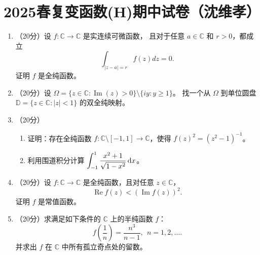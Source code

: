 \section{2025春复变函数(H)期中试卷（沈维孝）}
\begin{enumerate}
\item[一]（20分）设 $f: \mathbb{C} \rightarrow \mathbb{C}$ 是实连续可微函数，
且对于任意 $a \in \mathbb{C}$ 和 $r>0$，都成立
$$\int_{|z-a|=r} f(z) dz=0.$$
证明 $f$ 是全纯函数。
\item[二]（20分）设 $\Omega=\{z \in \mathbb{C}: \operatorname{Im}(z)>0\} \setminus \{i y: y \geq 1\}$。
找一个从 $\Omega$ 到单位圆盘 $\mathbb{D}=\{z \in \mathbb{C}:|z|<1\}$ 的双全纯映射。
\item[三]（20分）
\begin{enumerate}[label=(\arabic*)]
\item 证明：存在全纯函数 $f: \mathbb{C} \setminus [-1,1] \rightarrow \mathbb{C}$，使得 $f(z)^2=(z^2-1)^{-1}$。
\item 利用围道积分计算 $\displaystyle\int_{-1}^1 \frac{x^2+1}{\sqrt{1-x^2}}\,{\rm d}x$。
\end{enumerate}
\item[四]（20分）设 $f: \mathbb{C} \rightarrow \mathbb{C}$ 是全纯函数，且对任意 $z \in \mathbb{C}$，
$$\operatorname{Re} f(z)<(\operatorname{Im} f(z))^2.$$
证明 $f$ 是常值函数。
\item[五]（20分）求满足如下条件的 $\mathbb{C}$ 上的半纯函数 $f$：
$$f\left(\frac{1}{n}\right)=\frac{n^3}{n-1},\ \ n=1,2, \ldots.$$
并求出 $f$ 在 $\mathbb{C}$ 中所有孤立奇点处的留数。
\end{enumerate}

